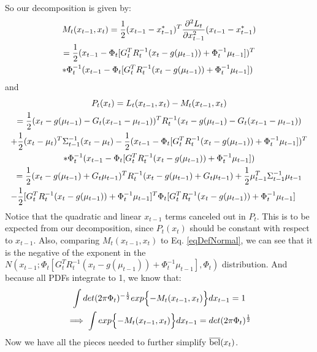 So our decomposition is given by:
\begin{multline*}
M_t(x_{t-1},x_t) = \frac{1}{2} (x_{t-1} - x_{t-1}^*)^T \frac{\partial^2 L_t}{\partial x_{t-1}^2} (x_{t-1} - x_{t-1}^*) \\
= \frac{1}{2} (x_{t-1} - \Phi_t [G_t^T R_t^{-1}  (x_t - g(\mu_{t-1})) + \Phi_t^{-1} \mu_{t-1}])^T \\
* \Phi_t^{-1} (x_{t-1} - \Phi_t [G_t^T R_t^{-1}  (x_t - g(\mu_{t-1})) + \Phi_t^{-1} \mu_{t-1}]) \hfill
\end{multline*}
and
\begin{multline} \label{eqDefPt}
P_t(x_t) = L_t(x_{t-1},x_t) -  M_t(x_{t-1},x_t) \\
= \frac{1}{2} (x_t - g(\mu_{t-1}) - G_t (x_{t-1} - \mu_{t-1}))^T R_t^{-1} (x_t - g(\mu_{t-1}) - G_t (x_{t-1} - \mu_{t-1}))\\
+ \frac{1}{2} (x_t - \mu_t)^T \Sigma_{t-1}^{-1} (x_t - \mu_t) - \frac{1}{2} (x_{t-1} - \Phi_t [G_t^T R_t^{-1}  (x_t - g(\mu_{t-1})) + \Phi_t^{-1} \mu_{t-1}])^T \\
* \Phi_t^{-1} (x_{t-1} - \Phi_t [G_t^T R_t^{-1}  (x_t - g(\mu_{t-1})) + \Phi_t^{-1} \mu_{t-1}]) \\
= \frac{1}{2} (x_t - g(\mu_{t-1}) + G_t \mu_{t-1})^T R_t^{-1} (x_t - g(\mu_{t-1}) + G_t \mu_{t-1}) + \frac{1}{2} \mu_{t-1}^T \Sigma_{t-1}^{-1} \mu_{t-1} \\
- \frac{1}{2} [G_t^T R_t^{-1}  (x_t - g(\mu_{t-1})) + \Phi_t^{-1} \mu_{t-1}]^T \Phi_t [G_t^T R_t^{-1}  (x_t - g(\mu_{t-1})) + \Phi_t^{-1} \mu_{t-1}] \hfill
\end{multline}
Notice that the quadratic and linear \(x_{t-1}\) terms canceled out in \(P_t\). This is to be expected from our decomposition, since \(P_t(x_t)\) should be constant with respect to \(x_{t-1}\). Also, comparing \(M_t(x_{t-1},x_t)\) to Eq. \ref{eqDefNormal}, we can see that it is the negative of the exponent in the \(N(x_{t-1};\Phi_t [G_t^T R_t^{-1}  (x_t - g(\mu_{t-1})) + \Phi_t^{-1} \mu_{t-1}], \Phi_t)\) distribution. And because all PDFs integrate to 1, we know that:
\begin{multline} \label{eqLtInt1}
\int det(2 \pi \Phi_t)^{-\frac{1}{2}} exp\Bigl\{-M_t(x_{t-1},x_t)\Bigr\}dx_{t-1} = 1 \\
\implies \int exp\Bigl\{-M_t(x_{t-1},x_t)\Bigr\}dx_{t-1} = det(2 \pi \Phi_t)^{\frac{1}{2}} \hfill
\end{multline}
Now we have all the pieces needed to further simplify \(\overline{\mathrm{bel}}(x_t)\).
